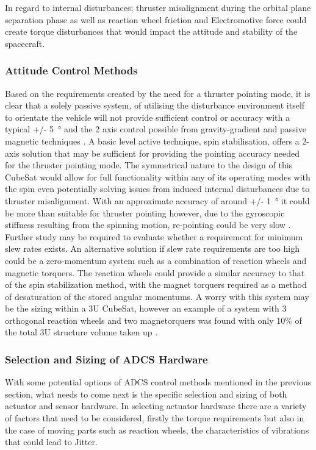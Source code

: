 In regard to internal disturbances; thruster misalignment during the orbital plane separation phase as well as reaction wheel friction and Electromotive force could create torque disturbances that would impact the attitude and stability of the spacecraft.

\subsubsection{Attitude Control Methods}

Based on the requirements created by the need for a thruster pointing mode, it
is clear that a solely passive system, of utilising the disturbance environment
itself to orientate the vehicle will not provide sufficient control or accuracy
with a typical +/- \SI{5}{\degree} and the 2 axis control possible from
gravity-gradient and passive magnetic techniques \cite{ADCS_nasa}.
A basic level active technique, spin stabilisation, offers a 2-axis solution that
may be sufficient for providing the pointing accuracy needed for the thruster
pointing mode. The symmetrical nature to the design of this CubeSat would allow
for full functionality within any of its operating modes with the spin even
potentially solving issues from induced internal disturbances due to thruster
misalignment. With an approximate accuracy of around +/- \SI{1}{\degree} it could
be more than suitable for thruster pointing however, due to the gyroscopic stiffness
resulting from the spinning motion, re-pointing could be very slow \cite{ADCS_nasa}.
Further study may be required to evaluate whether a requirement for minimum slew rates exists.
An alternative solution if slew rate requirements are too high could be a zero-momentum
system such as a combination of reaction wheels and magnetic torquers.
The reaction wheels could provide a similar accuracy to that of the spin
stabilization method, with the magnet torquers required as a method of desaturation
of the stored angular momentums. A worry with this system may be the sizing within
a 3U CubeSat, however an example of a system with 3 orthogonal reaction wheels and
two magnetorquers was found with only 10\% of the total 3U structure volume taken
up \cite{Delfi-n3xt}.

\subsubsection{Selection and Sizing of ADCS Hardware}

With some potential options of ADCS control methods mentioned in the previous section,
what needs to come next is the specific selection and sizing of both actuator and
sensor hardware. In selecting actuator hardware there are a variety of factors that
need to be considered, firstly the torque requirements but also in the case of
moving parts such as reaction wheels, the characteristics of vibrations that could
lead to Jitter.


